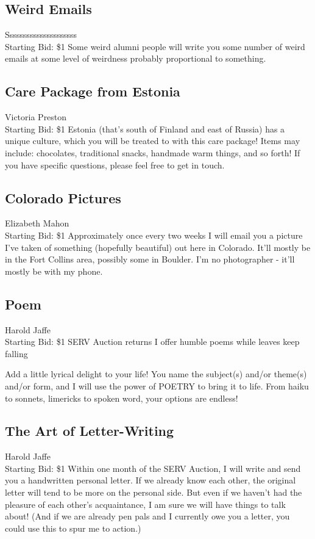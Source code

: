 \documentclass[11pt]{article}
\begin{document}
\subsection{Weird Emails}
Sssssssssssssssssssss
\\
Starting Bid: \$1
\newline
Some weird alumni people will write you some number of weird emails at some level of weirdness probably proportional to something.
\subsection{Care Package from Estonia}
Victoria Preston
\\
Starting Bid: \$1
\newline
Estonia (that's south of Finland and east of Russia) has a unique culture, which you will be treated to with this care package! Items may include: chocolates, traditional snacks, handmade warm things, and so forth! If you have specific questions, please feel free to get in touch.
\subsection{Colorado Pictures}
Elizabeth Mahon
\\
Starting Bid: \$1
\newline
Approximately once every two weeks I will email you a picture I've taken of something (hopefully beautiful) out here in Colorado. It'll mostly be in the Fort Collins area, possibly some in Boulder. I'm no photographer - it'll mostly be with my phone.
\subsection{Poem}
Harold Jaffe
\\
Starting Bid: \$1
\newline
SERV Auction returns
I offer humble poems
while leaves keep falling

Add a little lyrical delight to your life! You name the subject(s) and/or theme(s) and/or form, and I will use the power of POETRY to bring it to life. From haiku to sonnets, limericks to spoken word, your options are endless!
\subsection{The Art of Letter-Writing}
Harold Jaffe
\\
Starting Bid: \$1
\newline
Within one month of the SERV Auction, I will write and send you a handwritten personal letter. If we already know each other, the original letter will tend to be more on the personal side. But even if we haven't had the pleasure of each other's acquaintance, I am sure we will have things to talk about! (And if we are already pen pals and I currently owe you a letter, you could use this to spur me to action.)
\end{document}
